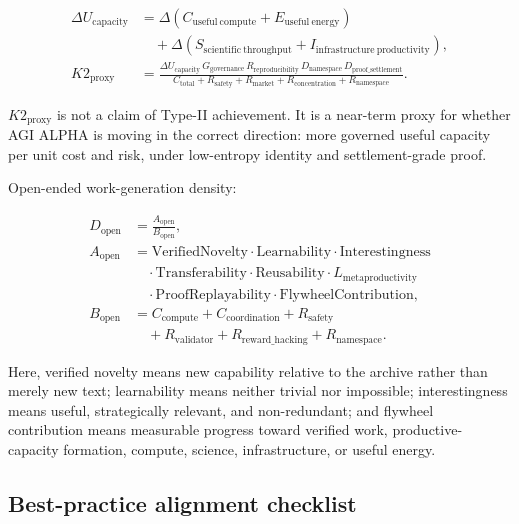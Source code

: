 \[
\begin{aligned}
\Delta U_{\mathrm{capacity}}
&=\Delta\!\left(C_{\mathrm{useful\ compute}}+E_{\mathrm{useful\ energy}}\right)\\
&\quad+\Delta\!\left(S_{\mathrm{scientific\ throughput}}
+I_{\mathrm{infrastructure\ productivity}}\right),\\[0.2em]
K2_{\mathrm{proxy}}
&=\frac{
\Delta U_{\mathrm{capacity}}\,
G_{\mathrm{governance}}\,
R_{\mathrm{reproducibility}}\,
D_{\mathrm{namespace}}\,
D_{\mathrm{proof\_settlement}}
}{
C_{\mathrm{total}}+R_{\mathrm{safety}}+R_{\mathrm{market}}
+R_{\mathrm{concentration}}+R_{\mathrm{namespace}}
}.
\end{aligned}
\]

\(K2_{\mathrm{proxy}}\) is not a claim of Type-II achievement. It is a
near-term proxy for whether AGI ALPHA is moving in the correct
direction: more governed useful capacity per unit cost and risk, under
low-entropy identity and settlement-grade proof.

Open-ended work-generation density:

\[
\begin{aligned}
D_{\mathrm{open}}&=\frac{A_{\mathrm{open}}}{B_{\mathrm{open}}},\\
A_{\mathrm{open}}&=\mathrm{VerifiedNovelty}\cdot\mathrm{Learnability}\cdot\mathrm{Interestingness}\\
&\quad\cdot\mathrm{Transferability}\cdot\mathrm{Reusability}\cdot L_{\mathrm{metaproductivity}}\\
&\quad\cdot\mathrm{ProofReplayability}\cdot\mathrm{FlywheelContribution},\\
B_{\mathrm{open}}&=C_{\mathrm{compute}}+C_{\mathrm{coordination}}+R_{\mathrm{safety}}\\
&\quad+R_{\mathrm{validator}}+R_{\mathrm{reward\_hacking}}+R_{\mathrm{namespace}}.
\end{aligned}
\]

Here, verified novelty means new capability relative to the archive
rather than merely new text; learnability means neither trivial nor
impossible; interestingness means useful, strategically relevant, and
non-redundant; and flywheel contribution means measurable progress
toward verified work, productive-capacity formation, compute, science,
infrastructure, or useful energy.

\subsection{Best-practice alignment
checklist}\label{best-practice-alignment-checklist}

